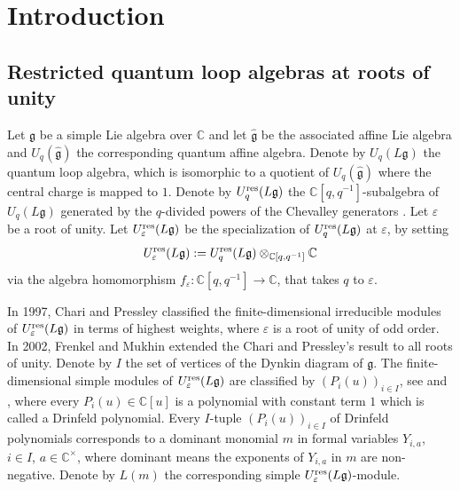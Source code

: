 \documentclass[11pt, reqno]{amsart}
\theoremstyle{plain}
\theoremstyle{definition}
\numberwithin{equation}{section}
\newcommand{\res}{{\rm res}}
\begin{document}
\maketitle 
\setcounter{tocdepth}{1}
\tableofcontents

\section{Introduction}
\subsection{Restricted quantum loop algebras at roots of unity}
Let $\mathfrak{g}$ be a simple Lie algebra over $\mathbb{C}$ and let $\mathfrak{\widehat{g}}$ be the associated affine Lie algebra and $U_q(\widehat{\mathfrak{g}})$ the corresponding quantum affine algebra. Denote by $U_q(L \mathfrak{g})$ the quantum loop algebra, which is isomorphic to a quotient of $U_q(\widehat{\mathfrak{g}})$ where the central charge is mapped to $1$. Denote by $U_q^{\res}({L\mathfrak{g}})$ the $\mathbb{C}[q,q^{-1}]$-subalgebra of $U_q(L\mathfrak{g})$ generated by the $q$-divided powers of the Chevalley generators {\cite[Section 1]{CP97}}. Let $\varepsilon$ be a root of unity. Let $U_\varepsilon^{\res}({L\mathfrak{g}})$ be the specialization of $U_q^{\res}({L\mathfrak{g}})$ at $\varepsilon$, by setting
\begin{align*}
U_\varepsilon^{\res}({L\mathfrak{g}}):=U_q^{\res}({L\mathfrak{g}}) \otimes_{\mathbb{C}[q, q^{-1}]}\mathbb{C}
\end{align*}
via the algebra homomorphism $f_{\varepsilon}: \mathbb{C}[q, q^{-1}]\rightarrow \mathbb{C}$, that takes $q$ to $\varepsilon$.


In 1997, Chari and Pressley \cite{CP97} classified the finite-dimensional irreducible modules of $U_{\varepsilon}^{\res}(L\mathfrak{g})$ in terms of highest weights, where $\varepsilon$ is a root of unity of odd order. In 2002, Frenkel and Mukhin \cite{FM02} extended the Chari and Pressley's result to all roots of unity. Denote by $I$ the set of vertices of the Dynkin diagram of $\mathfrak{g}$. The finite-dimensional simple modules of $U_{\varepsilon}^{\res}(L\mathfrak{g})$ are classified by $(P_i(u))_{i \in I}$, see \cite[Theorem 8.2]{CP97} and \cite[Theorem 2.4]{FM02}, where every $P_i(u) \in \mathbb{C}[u]$ is a polynomial with constant term $1$ which is called a Drinfeld polynomial. Every $I$-tuple $(P_i(u))_{i \in I}$ of Drinfeld polynomials corresponds to a dominant monomial $m$ in formal variables $Y_{i,a}$, $i \in I$, $a \in \mathbb{C}^{\times}$, where dominant means the exponents of $Y_{i,a}$ in $m$ are non-negative. Denote by $L(m)$ the corresponding simple $U_{\varepsilon}^{\res}(L\mathfrak{g})$-module.
\end{document}
